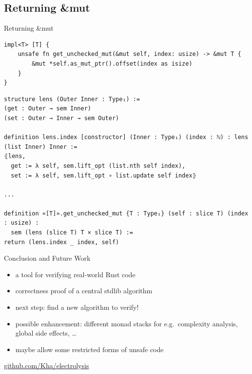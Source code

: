 \documentclass{beamer}
\begin{document}
\subsection{Returning \&mut}
\begin{frame}[fragile]{Returning \&mut}
  \begin{verbatim}
impl<T> [T] {
    unsafe fn get_unchecked_mut(&mut self, index: usize) -> &mut T {
        &mut *self.as_mut_ptr().offset(index as isize)
    }
}
  \end{verbatim} 
  \begin{verbatim}
structure lens (Outer Inner : Type₁) :=
(get : Outer → sem Inner)
(set : Outer → Inner → sem Outer)

definition lens.index [constructor] (Inner : Type₁) (index : ℕ) : lens (list Inner) Inner :=
⦃lens,
  get := λ self, sem.lift_opt (list.nth self index),
  set := λ self, sem.lift_opt ∘ list.update self index⦄

...

definition «[T]».get_unchecked_mut {T : Type₁} (self : slice T) (index : usize) :
  sem (lens (slice T) T × slice T) :=
return (lens.index _ index, self)
  \end{verbatim}
\end{frame}


\begin{frame}{Conclusion and Future Work}
  \begin{itemize}
    \item a tool for verifying real-world Rust code
    \item correctness proof of a central stdlib algorithm

    \hfill

    \item next step: find a new algorithm to verify!
    \item possible enhancement: different monad stacks for e.g.\ complexity analysis, global side effects, \dots
    \item maybe allow some restricted forms of unsafe code
  \end{itemize}

  \hfill

  \begin{center}
    \large\url{github.com/Kha/electrolysis}
  \end{center}
\end{frame}
\end{document}
